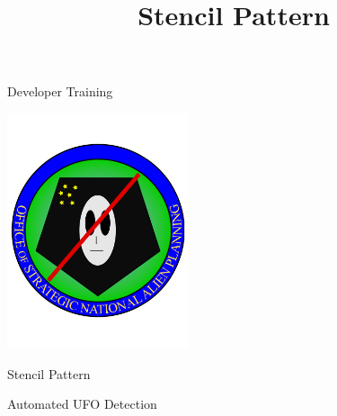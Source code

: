 \documentclass[xcolor=dvipsnames]{beamer}
\begin{document}
	\title[Stencil Pattern]{Stencil Pattern}
	\author[]{\className}
	\institute[\className]{\departmentName}
	\date{} 


	\begin{frame}
		\maketitle
	\end{frame}
	
	\begin{frame}{Developer Training}
		\begin{center}
			\includegraphics[width=0.4\textwidth]{images/OSNAP_logo} 
			
			Stencil Pattern
			
			Automated UFO Detection
		\end{center}
	\end{frame}
	
\end{document}
